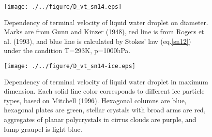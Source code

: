\begin{table}[h]
\begin{center}
\caption{Branch points of the weighted terminal velocity.}
\label{table_sn14-2-10}
\end{center}
\end{table}

\begin{figure}[htbp]
\begin{center}
\texttt{[image: ./../figure/D\_vt\_sn14.eps]}
\end{center}
\caption{Dependency of terminal velocity of liquid water droplet on diameter. Marks are from Gunn and Kinzer (1948), red line is from Rogers et al. (1993), and blue line is calculated by Stokes’ law (eq.\ref{sn12}) under the condition T=293K, p=1000hPa.}
\label{figsn2-11}
\end{figure}

\begin{figure}[htbp]
\begin{center}
\texttt{[image: ./../figure/D\_vt\_sn14-ice.eps]}
\end{center}
\caption{Dependency of terminal velocity of liquid water droplet in maximum dimension. Each solid line color corresponds to different ice particle types, based on Mitchell (1996). Hexagonal columns are blue, hexagonal plates are green, stellar crystals with broad arms are red, aggregates of planar polycrystals in cirrus clouds are purple, and lump graupel is light blue.}
\label{figsn2-12}
\end{figure}

